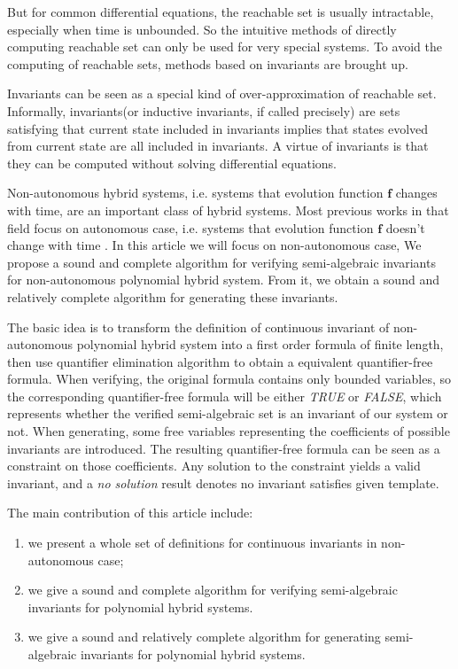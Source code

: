 \documentclass{jssc}
\begin{document}
But for common differential equations, the reachable set is usually intractable, especially when time is unbounded. So the intuitive methods of directly computing reachable set can only be used for very special systems. To avoid the computing of reachable sets, methods based on invariants are brought up\cite{sankaranarayanan2004constructing, prajna2004safety}.

Invariants can be seen as a special kind of over-approximation of reachable set. Informally, invariants(or inductive invariants, if called precisely) are sets satisfying that current state included in invariants implies that states evolved from current state are all included in invariants. A virtue of invariants is that they can be computed without solving differential equations.

Non-autonomous hybrid systems, i.e. systems that evolution function $\boldsymbol{f}$ changes with time, are an important class of hybrid systems. Most previous works in that field focus on autonomous case, i.e. systems that evolution function $\boldsymbol{f}$ doesn't change with time \cite{liu2011computing}. In this article we will focus on non-autonomous case, We propose a sound and complete algorithm for verifying semi-algebraic invariants for non-autonomous polynomial hybrid system. From it, we obtain a sound and relatively complete algorithm for generating these invariants.

The basic idea is to transform the definition of continuous invariant of non-autonomous polynomial hybrid system into a first order formula of finite length, then use quantifier elimination algorithm to obtain a equivalent quantifier-free formula. When verifying, the original formula contains only bounded variables, so the corresponding quantifier-free  formula will be either \emph{TRUE} or \emph{FALSE}, which represents whether the verified semi-algebraic set is an invariant of our system or not. When generating, some free variables representing the coefficients of possible invariants are introduced. The resulting quantifier-free formula can be seen as a constraint on those coefficients. Any solution to the constraint yields a valid invariant, and a \emph{no solution} result denotes no invariant satisfies given template.

The main contribution of this article include:
\begin{enumerate}
	\item we present a whole set of definitions for continuous invariants in non-autonomous case;
	\item we give a sound and complete algorithm for verifying semi-algebraic invariants for polynomial hybrid systems.
	\item we give a sound and relatively complete algorithm for generating semi-algebraic invariants for polynomial hybrid systems.
\end{enumerate}
\end{document}
